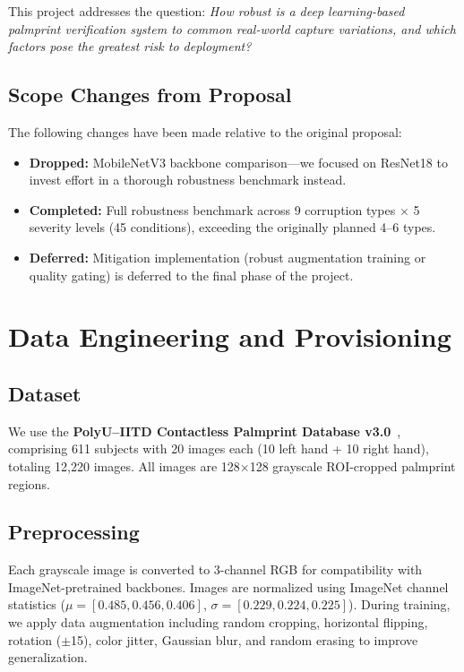 \documentclass[conference]{IEEEtran}
\begin{document}
This project addresses the question: \textit{How robust is a deep learning-based palmprint verification system to common real-world capture variations, and which factors pose the greatest risk to deployment?}

\subsection{Scope Changes from Proposal}

{\color{blue}
The following changes have been made relative to the original proposal:
\begin{itemize}
    \item \textbf{Dropped:} MobileNetV3 backbone comparison---we focused on ResNet18 to invest effort in a thorough robustness benchmark instead.
    \item \textbf{Completed:} Full robustness benchmark across 9 corruption types $\times$ 5 severity levels (45 conditions), exceeding the originally planned 4--6 types.
    \item \textbf{Deferred:} Mitigation implementation (robust augmentation training or quality gating) is deferred to the final phase of the project.
\end{itemize}
}

\section{Data Engineering and Provisioning}

\subsection{Dataset}

We use the \textbf{PolyU--IITD Contactless Palmprint Database v3.0}~\cite{polyu}, comprising 611 subjects with 20 images each (10 left hand + 10 right hand), totaling 12,220 images. All images are 128$\times$128 grayscale ROI-cropped palmprint regions.

\subsection{Preprocessing}

Each grayscale image is converted to 3-channel RGB for compatibility with ImageNet-pretrained backbones. Images are normalized using ImageNet channel statistics ($\mu = [0.485, 0.456, 0.406]$, $\sigma = [0.229, 0.224, 0.225]$). During training, we apply data augmentation including random cropping, horizontal flipping, rotation ($\pm$15\textdegree), color jitter, Gaussian blur, and random erasing to improve generalization.
\end{document}
